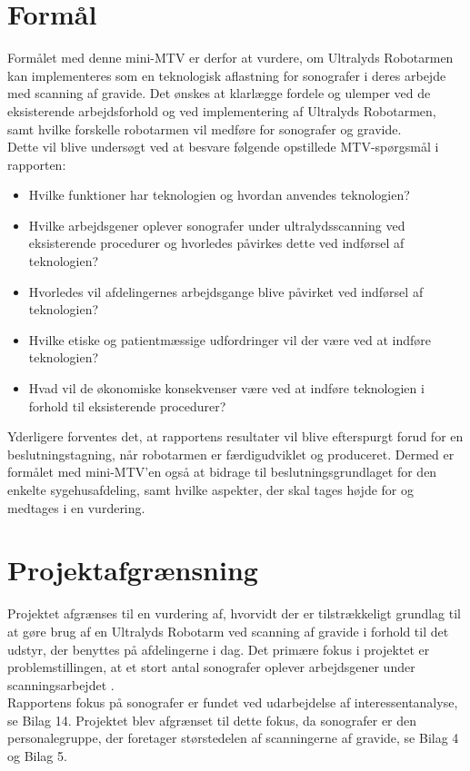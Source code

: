 
\section{Formål}
Formålet med denne mini-MTV er derfor at vurdere, om Ultralyds Robotarmen kan implementeres som en teknologisk aflastning for sonografer i deres arbejde med scanning af gravide. Det ønskes at klarlægge fordele og ulemper ved de eksisterende arbejdsforhold og ved implementering af Ultralyds Robotarmen, samt hvilke forskelle robotarmen vil medføre for sonografer og gravide. \\
Dette vil blive undersøgt ved at besvare følgende opstillede MTV-spørgsmål i rapporten:
\begin{itemize}
\item Hvilke funktioner har teknologien og hvordan anvendes teknologien?
\item Hvilke arbejdsgener oplever sonografer under ultralydsscanning ved eksisterende procedurer og hvorledes påvirkes dette ved indførsel af teknologien?
\item Hvorledes vil afdelingernes arbejdsgange blive påvirket ved indførsel af teknologien?
\item Hvilke etiske og patientmæssige udfordringer vil der være ved at indføre teknologien?
\item Hvad vil de økonomiske konsekvenser være ved at indføre teknologien i forhold til eksisterende procedurer?
\end{itemize}

Yderligere forventes det, at rapportens resultater vil blive efterspurgt forud for en beslutningstagning, når robotarmen er færdigudviklet og produceret. Dermed er formålet med mini-MTV’en også at bidrage til beslutningsgrundlaget for den enkelte sygehusafdeling, samt hvilke aspekter, der skal tages højde for og medtages i en vurdering.

\section{Projektafgrænsning}
Projektet afgrænses til en vurdering af, hvorvidt der er tilstrækkeligt grundlag til at gøre brug af en Ultralyds Robotarm ved scanning af gravide i forhold til det udstyr, der benyttes på afdelingerne i dag. Det primære fokus i projektet er problemstillingen, at et stort antal sonografer oplever arbejdsgener under scanningsarbejdet \cite{1}\cite{24}\cite{30}\cite{31}\cite{36}. \\
Rapportens fokus på sonografer er fundet ved udarbejdelse af interessentanalyse, se Bilag 14. Projektet blev afgrænset til dette fokus, da sonografer er den personalegruppe, der foretager størstedelen af scanningerne af gravide, se Bilag 4 og Bilag 5.

